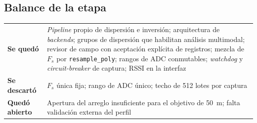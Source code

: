 \subsection{Balance de la etapa}

\begin{center}\small
\begin{tabularx}{\textwidth}{@{}l X@{}}
\toprule
\textbf{Se qued\'o} & \emph{Pipeline} propio de dispersi\'on e inversi\'on; arquitectura de \emph{backends}; grupos de dispersi\'on que habilitan an\'alisis multimodal; revisor de campo con aceptaci\'on expl\'icita de registros; mezcla de $F_s$ por \texttt{resample\_poly}; rangos de ADC conmutables; \emph{watchdog} y \emph{circuit-breaker} de captura; RSSI en la interfaz \\
\addlinespace[3pt]
\textbf{Se descart\'o} & $F_s$ \'unica fija; rango de ADC \'unico; techo de 512 lotes por captura \\
\addlinespace[3pt]
\textbf{Qued\'o abierto} & Apertura del arreglo insuficiente para el objetivo de \SI{50}{\meter}; falta validaci\'on externa del perfil \\
\bottomrule
\end{tabularx}
\end{center}
